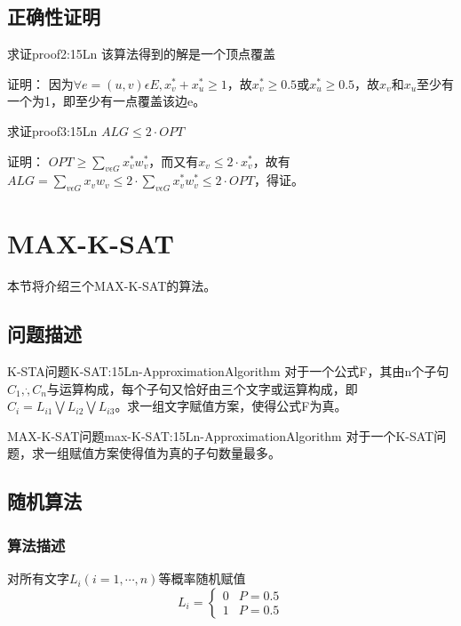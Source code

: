 \subsection{正确性证明}

\begin{proposition}{求证}{proof2:15Ln}
	该算法得到的解是一个顶点覆盖
\end{proposition}
证明：
	因为$\forall e=(u,v)\epsilon E,x_v^*+x_u^*\geqslant 1$，故$x_v^*\geqslant 0.5$或$x_u^*\geqslant 0.5$，故$x_v$和$x_u$至少有一个为1，即至少有一点覆盖该边e。
\begin{proposition}{求证}{proof3:15Ln}
	$ALG\leqslant 2\cdot OPT$
\end{proposition}
证明：
	$OPT\geqslant \sum_{v\epsilon G} x_v^*w_v^*$，而又有$x_v\leqslant 2\cdot x_v^*$，故有
	$ALG=\sum_{v\epsilon G} x_vw_v\leqslant 2\cdot \sum_{v\epsilon G} x_v^*w_v^*\leqslant 2\cdot OPT$，得证。

\section{MAX-K-SAT}

本节将介绍三个MAX-K-SAT的算法。

\subsection{问题描述}

\begin{definition}{K-STA问题}{K-SAT:15Ln-ApproximationAlgorithm}
	对于一个公式F，其由n个子句${C_1,\dot ,C_n}$与运算构成，每个子句又恰好由三个文字或运算构成，即$C_i=L_{i1}\bigvee L_{i2}\bigvee L_{i3}$。求一组文字赋值方案，使得公式F为真。
\end{definition}

\begin{definition}{MAX-K-SAT问题}{max-K-SAT:15Ln-ApproximationAlgorithm}
	对于一个K-SAT问题，求一组赋值方案使得值为真的子句数量最多。
\end{definition}

\subsection{随机算法}

\subsubsection{算法描述}

对所有文字$L_i (i=1,\cdots,n)$等概率随机赋值
\[
	L_i=\begin{cases}
		0 &P=0.5\\
		1 &P=0.5
	\end{cases}
\]

